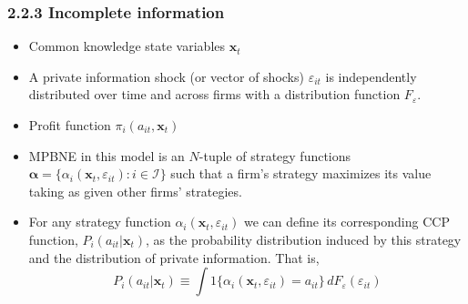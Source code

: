 \documentclass[aspectratio=169]{beamer}  %
\begin{document}
\begin{frame}
\frametitle{2.2.3 Incomplete information}
    \begin{itemize}
        \item Common knowledge state variables $\mathbf{x}_t$
        \item A private information shock (or vector of shocks) $\varepsilon_{it}$ is independently distributed over time and across firms with a distribution function $F_{\varepsilon}$.
        \item Profit function $\pi_i(a_{it}, \mathbf{x}_t)$
        \item MPBNE in this model is an \(N\)-tuple of strategy functions \(\boldsymbol{\alpha} = \{\alpha_i(\mathbf{x}_t, \varepsilon_{it}) : i \in \mathcal{I}\}\) such that a firm's strategy maximizes its value taking as given other firms' strategies.
        \item For any strategy function $\alpha_i(\mathbf{x}_t, \varepsilon_{it})$ we can define its corresponding CCP function, $P_i(a_{it}|\mathbf{x}_t)$, as the probability distribution induced by this strategy and the distribution of private information. That is,
        \begin{equation}\label{3}
            P_i(a_{it}|\mathbf{x}_t) \equiv \int 1\{\alpha_i(\mathbf{x}_t, \varepsilon_{it}) = a_{it}\} \, dF_{\varepsilon}(\varepsilon_{it})
        \end{equation}
    \end{itemize}
\end{frame}
\end{document}
